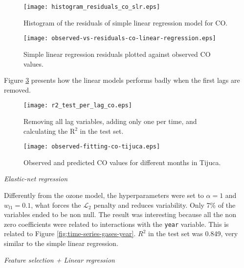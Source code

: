 \begin{figure}
    \centering
    \texttt{[image: histogram\_residuals\_co\_slr.eps]}
    \caption{Histogram of the residuals of simple linear regression model for CO.}
    \label{fig:histogram-residuals-co-slr}
\end{figure}

\begin{figure}[!ht]
    \centering
    \texttt{[image: observed-vs-residuals-co-linear-regression.eps]}
    \caption{Simple linear regression residuals plotted against
    observed CO values.}
    \label{fig:observed-vs-residual-co-linear-regression}
\end{figure}

Figure \ref{fig:r2-test-lag-co} presents how the linear models performs badly when the first lags are removed.

\begin{figure}[!ht]
    \centering
    \texttt{[image: r2\_test\_per\_lag\_co.eps]}
    \caption{Removing all lag variables, adding only one per time, and calculating the R$^2$ in the test set.}
    \label{fig:r2-test-lag-co}
\end{figure}

\begin{figure*}[!ht]
    \centering
    \texttt{[image: observed-fitting-co-tijuca.eps]}
    \caption{Observed and predicted CO values for different months in Tijuca.}
    \label{fig:observed-fitting-co-tijuca}
\end{figure*}

\vspace{2mm}

{\em Elastic-net regression}

\vspace{2mm}

Differently from the ozone model, the hyperparameters were set to $\alpha = 1$
and $w_{l1} = 0.1$, what forces the $\mathcal{L}_2$ penalty and reduces
variability. Only 7\% of the variables ended to be non null. The result was interesting because all the non
zero coefficients were related to interactions with the {\tt year} variable.
This is related to Figure \ref{fig:time-series-gases-year}. $R^2$ in the test
set was 0.849, very similar to the simple linear regression. 

\vspace{2mm}

{\em Feature selection + Linear regression}

